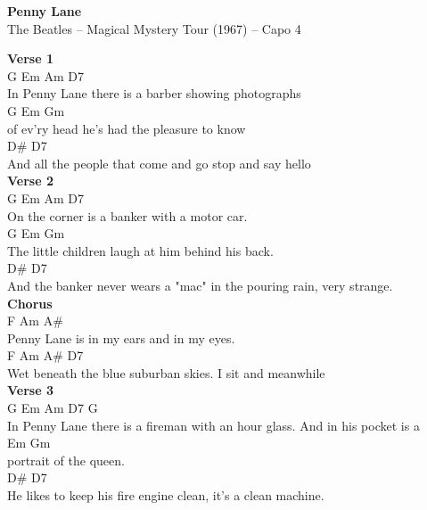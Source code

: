 \documentclass[a4paper]{article}
\begin{document}
    \begin{center}
        \textbf{Penny Lane}
        ~\\
        The Beatles -- Magical Mystery Tour (1967)
         -- Capo 4
    \end{center}
    {
        \scriptsize
        \textbf{Verse 1}
        ~\\
        {
            \cutive
            \obeyspaces
        G               Em            Am        D7
\\
In Penny Lane there is a barber showing photographs
\\
         G                 Em         Gm
\\
of ev'ry head he's had the pleasure to know
\\
                                 D\#           D7     
\\
And all the people that come and go stop and say hello
\\

        }
        \textbf{Verse 2}
        ~\\
        {
            \cutive
            \obeyspaces
       G           Em           Am       D7
\\
On the corner is a banker with a motor car.
\\
           G                 Em            Gm
\\
The little children laugh at him behind his back.
\\
                              D\#           D7
\\
And the banker never wears a "mac" in the pouring rain, very strange.
\\

        }
        \textbf{Chorus}
        ~\\
        {
            \cutive
            \obeyspaces
      F             Am             A\#
\\
Penny Lane is in my ears and in my eyes.
\\
F               Am            A\#                D7
\\
Wet beneath the blue suburban skies. I sit and meanwhile
\\

        }
        \textbf{Verse 3}
        ~\\
        {
            \cutive
            \obeyspaces
         G               Em             Am        D7           G
\\
In Penny Lane there is a fireman with an hour glass. And in his pocket is a 
\\
Em             Gm
\\
portrait of the queen.
\\
                                 D\#             D7
\\
He likes to keep his fire engine clean, it's a clean machine.
\\

}}
\end{document}
